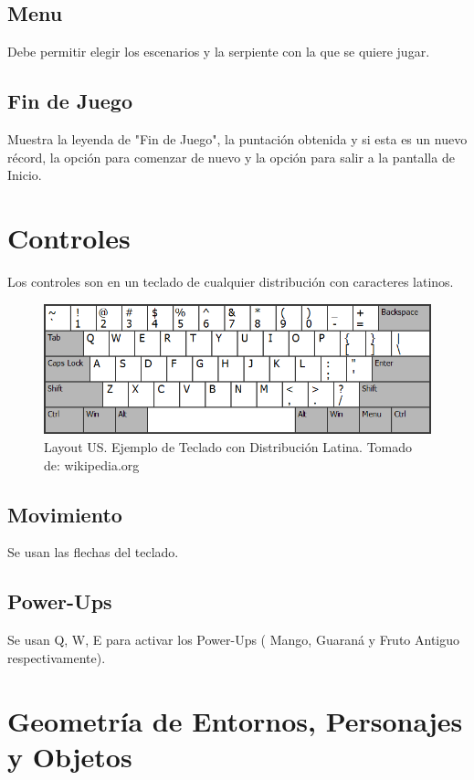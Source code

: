 \documentclass[letterpaper]{scrreprt}
\begin{document}
\section{Menu}
Debe permitir elegir los escenarios y la serpiente con la que se quiere jugar. 

\section{Fin de Juego}
Muestra la leyenda de "Fin de Juego", la puntación obtenida y si esta es un nuevo récord, la opción para comenzar de nuevo y la opción para salir a la pantalla de Inicio.


\chapter{Controles}
Los controles son en un teclado de cualquier distribución con caracteres latinos.
\begin{figure}
[h]
	\includegraphics[scale=0.7]{layout.png}
	\centering
	\caption{\label{fig:sprintbacklog} Layout US. Ejemplo de Teclado con Distribución Latina. Tomado de:  wikipedia.org}
\end{figure}
\section{Movimiento}
Se usan las flechas del teclado.
\section{Power-Ups}
Se usan Q, W, E para activar los Power-Ups ( Mango, Guaraná y Fruto Antiguo respectivamente).



\chapter{Geometría de Entornos, Personajes y Objetos}
\end{document}
